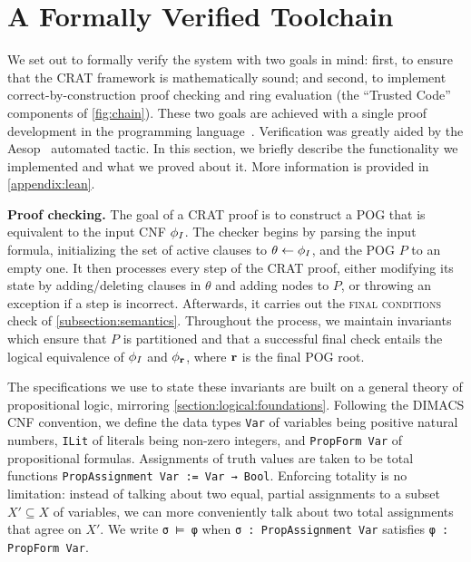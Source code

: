 \section{A Formally Verified Toolchain}
\label{section:formally-verified-toolchain}

We set out to formally verify the system with two goals in mind: first, to ensure that the CRAT framework is mathematically
sound; and second, to implement correct-by-construction proof checking and ring evaluation (the ``Trusted Code'' components of \cref{fig:chain}). These two goals are achieved with a single proof development in the \lean{} programming language~\cite{demoura:cade:2021}. Verification was greatly aided by the Aesop~\cite{23limperg_aesop_white_box_best_first_proof_search_lean} automated tactic. In this section, we briefly describe the functionality we implemented and what we proved about it. More information is provided in \cref{appendix:lean}.

\vspace{1em}\noindent
\textbf{Proof checking.} The goal of a CRAT proof is to construct a POG that is equivalent to the input CNF $\phi_I$. The checker begins by parsing the input formula, initializing the set of active clauses to $\theta \leftarrow \phi_I$, and the POG $P$ to an empty one. It then processes every step of the CRAT proof, either modifying its state by adding/deleting clauses in $\theta$ and adding nodes to $P$, or throwing an exception if a step is incorrect. Afterwards, it carries out the \textsc{final conditions} check of \cref{subsection:semantics}. Throughout the process, we maintain invariants which ensure that $P$ is partitioned and that a successful final check entails the logical equivalence of $\phi_I$ and $\phi_{\mathbf{r}}$, where $\mathbf{r}$ is the final POG root.

The specifications we use to state these invariants are built on a general theory of propositional logic, mirroring \cref{section:logical:foundations}. Following the DIMACS CNF convention, we define the data types \lstinline{Var} of variables being positive natural numbers, \lstinline{ILit} of literals being non-zero integers, and \lstinline{PropForm Var} of propositional formulas. Assignments of truth values are taken to be total functions \lstinline{PropAssignment Var := Var → Bool}. Enforcing totality is no limitation: instead of talking about two equal, partial assignments to a subset $X' \subseteq X$ of variables, we can more conveniently talk about two total assignments that agree on $X'$. We write \lstinline{σ ⊨ φ} when \lstinline{σ : PropAssignment Var} satisfies \lstinline{φ : PropForm Var}.

